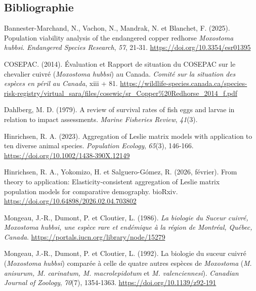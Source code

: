 \documentclass[9pt,twocolumn,twoside,]{pnas-new}
\newlength{\cslhangindent}
\newenvironment{CSLReferences}[2] %
 {\begin{list}{}{%
  \setlength{\itemindent}{0pt}
  \setlength{\leftmargin}{0pt}
  \setlength{\parsep}{0pt}
  \ifodd #1
   \setlength{\leftmargin}{\cslhangindent}
   \setlength{\itemindent}{-1\cslhangindent}
  \fi
  \setlength{\itemsep}{#2\baselineskip}}}
 {\end{list}}
\begin{document}
\subsection*{Bibliographie}\label{bibliographie}

\pnasbreak

\label{refs}
\begin{CSLReferences}{1}{0}
Bannester-Marchand, N., Vachon, N., Mandrak, N. et Blanchet, F. (2025).
Population viability analysis of the endangered copper redhorse
\emph{{Moxostoma} hubbsi}. \emph{Endangered Species Research},
\emph{57}, 21‑31. \url{https://doi.org/10.3354/esr01395}

COSEPAC. (2014). Évaluation et {Rapport} de situation du {COSEPAC} sur
le chevalier cuivré (\emph{{Moxostoma} hubbsi}) au {Canada}.
\emph{Comité sur la situation des espèces en péril au Canada}, xiii +
81.
\url{https://wildlife-species.canada.ca/species-risk-registry/virtual_sara/files/cosewic/sr_Copper\%20Redhorse_2014_f.pdf}

Dahlberg, M. D. (1979). A review of survival rates of fish eggs and
larvae in relation to impact assessments. \emph{Marine Fisheries
Review}, \emph{41}(3).

Hinrichsen, R. A. (2023). Aggregation of {Leslie} matrix models with
application to ten diverse animal species. \emph{Population Ecology},
\emph{65}(3), 146‑166. \url{https://doi.org/10.1002/1438-390X.12149}

Hinrichsen, R. A., Yokomizo, H. et Salguero-Gómez, R. (2026, février).
From theory to application: {Elasticity}-consistent aggregation of
{Leslie} matrix population models for comparative demography. bioRxiv.
\url{https://doi.org/10.64898/2026.02.04.703802}

Mongeau, J.-R., Dumont, P. et Cloutier, L. (1986). \emph{La biologie du
{Suceur} cuivré, \emph{{Moxostoma} hubbsi}, une espèce rare et endémique
à la région de {Montréal}, {Québec}, {Canada}}.
\url{https://portals.iucn.org/library/node/15279}

Mongeau, J.-R., Dumont, P. et Cloutier, L. (1992). La biologie du suceur
cuivré (\emph{{Moxostoma} hubbsi}) comparée à celle de quatre autres
espèces de \emph{Moxostoma} (\emph{{M}. anisurum, {M}. carinatum, {M}.
macrolepidotum} et \emph{{M}. valenciennesi}). \emph{Canadian Journal of
Zoology}, \emph{70}(7), 1354‑1363. \url{https://doi.org/10.1139/z92-191}


\end{CSLReferences}
\end{document}
